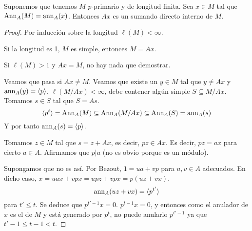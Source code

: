 \begin{prop}
  Suponemos que tenemos \(M\) \(p\)-primario y de longitud finita. Sea
  \(x\in M\) tal que \(\operatorname{Ann}_A(M)=\operatorname{ann}_A(x)\). Entonces \(Ax\) es un
  sumando directo interno de \(M\).
\end{prop}
\begin{proof}
  Por inducción sobre la longitud \(\ell(M)<\infty\).

  Si la longitud es 1, \(M\) es simple, entonces \(M=Ax\).

  Si \(\ell(M)>1\) y \(Ax=M\), no hay nada que demostrar.

  Veamos que pasa si \(Ax\neq M\). Veamos que existe un \(y \in M\)
  tal que \(y\neq Ax\) y \(\operatorname{ann}_A(y)=\langle p\rangle\).
  \(
    \ell(M/Ax)<\infty
  \), debe contener algún simple \(S\subseteq M/Ax\). Tomamos \(s\in S\)
  tal que \(S=As\).
  \[
    \langle p^t\rangle =\operatorname{Ann}_A(M)\subseteq\operatorname{Ann}_A(M/Ax)\subseteq\operatorname{Ann}_A(S)
    =\operatorname{ann}_A(s)
  \]
  Y por tanto \(\operatorname{ann}_A(s)=\langle p\rangle\).

  Tomamos \(z\in M\) tal que \(s=z+Ax\), es decir, \(p z\in Ax\). Es decir,
  \(p z=ax\) para cierto \(a\in A\). Afirmamos que \(p|a\) (no es obvio
  porque es un módulo).

  Supongamos que no es así. Por Bezout, \(1=ua+vp\) para \(u,v\in A\)
  adecuados. En dicho caso, \(x=uax+vpx=upz+vpx=p(uz+vx)\).
  \[
    \operatorname{ann}_A(uz+vx)=\langle p^{t'}\rangle
  \]
  para \(t'\le t\). Se deduce que \(p^{t'-1} x=0\). \(p^{t-1}x=0\), y
  entonces como el anulador de \(x\) es el de \(M\) y está generado
  por \(p^t\), no puede anularlo \(p^{t'-1}\) ya que
  \(t'-1\le t-1<t\).

\end{proof}
